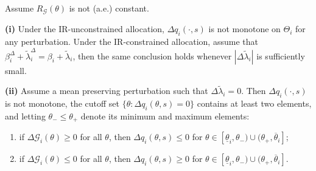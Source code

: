 \documentclass[master.tex]{subfiles}
\begin{document}
\begin{proposition}\label{prop:rprefreallocation}
Assume $R_{\mathcal{G}}(\theta)$ is not (a.e.) constant.

\noindent\textbf{(i)} Under the IR-unconstrained allocation, $\Delta q_i(\cdot,s)$ is not monotone on $\Theta_i$ for any perturbation. Under the IR-constrained allocation, assume that $\beta_i^\Delta+\tilde\lambda_i^\Delta=\beta_i+\tilde\lambda_i$, then the same conclusion holds whenever $|\Delta\tilde\lambda_i|$ is sufficiently small.

\noindent\textbf{(ii)} Assume a mean preserving perturbation such that $\Delta\tilde\lambda_i=0$. Then $\Delta q_i(\cdot,s)$ is not monotone, the cutoff set $\{\theta:\Delta q_i(\theta,s)=0\}$ contains at least two elements, and letting $\theta_-\le\theta_+$ denote its minimum and maximum elements:
\begin{enumerate}[label=(\roman*), leftmargin=1cm]
\item if $\Delta\mathcal{G}_i(\theta)\ge 0$ for all $\theta$, then $\Delta q_i(\theta,s)\le 0$ for $\theta\in[\underline\theta_i,\theta_-)\cup(\theta_+,\overline\theta_i]$;
\item if $\Delta\mathcal{G}_i(\theta)\le 0$ for all $\theta$, then $\Delta q_i(\theta,s)\ge 0$ for $\theta\in[\underline\theta_i,\theta_-)\cup(\theta_+,\overline\theta_i]$.
\end{enumerate}
\end{proposition}
\end{document}
